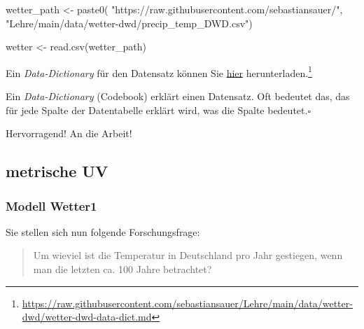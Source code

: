 \documentclass[
  letterpaper,
]{scrbook}
\newenvironment{Shaded}{\begin{snugshade}}{\end{snugshade}}
\newcommand{\FunctionTok}[1]{\textcolor[rgb]{0.28,0.35,0.67}{#1}}
\newcommand{\NormalTok}[1]{\textcolor[rgb]{0.00,0.23,0.31}{#1}}
\newcommand{\OtherTok}[1]{\textcolor[rgb]{0.00,0.23,0.31}{#1}}
\newcommand{\StringTok}[1]{\textcolor[rgb]{0.13,0.47,0.30}{#1}}
\theoremstyle{definition}
\theoremstyle{definition}
\theoremstyle{definition}
\theoremstyle{remark}
\begin{document}
\begin{Shaded}
\begin{Highlighting}[]
\NormalTok{wetter\_path }\OtherTok{\textless{}{-}} \FunctionTok{paste0}\NormalTok{(}
  \StringTok{"https://raw.githubusercontent.com/sebastiansauer/"}\NormalTok{,}
  \StringTok{"Lehre/main/data/wetter{-}dwd/precip\_temp\_DWD.csv"}\NormalTok{)}

\NormalTok{wetter }\OtherTok{\textless{}{-}} \FunctionTok{read.csv}\NormalTok{(wetter\_path)}
\end{Highlighting}
\end{Shaded}

Ein \emph{Data-Dictionary} für den Datensatz können Sie
\href{https://raw.githubusercontent.com/sebastiansauer/Lehre/main/data/wetter-dwd/wetter-dwd-data-dict.md}{hier}
herunterladen.\footnote{\url{https://raw.githubusercontent.com/sebastiansauer/Lehre/main/data/wetter-dwd/wetter-dwd-data-dict.md}}

\begin{tcolorbox}[enhanced jigsaw, left=2mm, toptitle=1mm, toprule=.15mm, rightrule=.15mm, leftrule=.75mm, breakable, colbacktitle=quarto-callout-note-color!10!white, colback=white, coltitle=black, bottomtitle=1mm, opacityback=0, title=\textcolor{quarto-callout-note-color}{\faInfo}\hspace{0.5em}{Hinweis}, colframe=quarto-callout-note-color-frame, arc=.35mm, opacitybacktitle=0.6, bottomrule=.15mm, titlerule=0mm]

Ein \emph{Data-Dictionary} (Codebook) erklärt einen Datensatz. Oft
bedeutet das, das für jede Spalte der Datentabelle erklärt wird, was die
Spalte bedeutet.\(\square\)

\end{tcolorbox}

Hervorragend! An die Arbeit!

\subsection{metrische UV}\label{metrische-uv}

\subsubsection{Modell Wetter1}\label{modell-wetter1}

Sie stellen sich nun folgende Forschungsfrage:

\begin{quote}
{} Um wieviel ist die Temperatur in Deutschland pro Jahr
gestiegen, wenn man die letzten ca. 100 Jahre betrachtet?
\end{quote}
\end{document}
